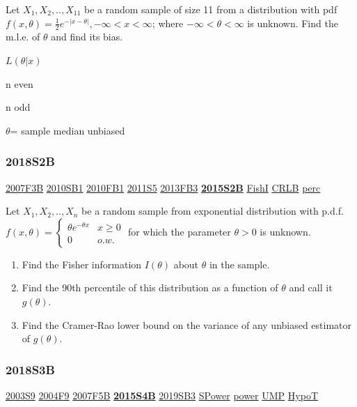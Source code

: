 \documentclass[10pt,twocolumn,portrait]{article}
\begin{document}
Let \(X_1,X_2,..,X_{11}\) be a random sample of size 11 from a
distribution with pdf
\(f(x,\theta) =\frac12e^{-|x-\theta|}, -\infty<x<\infty\); where
\(-\infty<\theta<\infty\) is unknown. Find the m.l.e. of \(\theta\) and
find its bias.

\(L(\theta|x)\)

n even

n odd

\(\theta\)= sample median unbiased

\hypertarget{s2b-2}{%
\subsubsection{2018S2B}\label{s2b-2}}

\protect\hyperlink{f3b}{2007F3B} \protect\hyperlink{sb1-1}{2010SB1}
\protect\hyperlink{fb1-1}{2010FB1} \protect\hyperlink{s5-2}{2011S5}
\protect\hyperlink{fb3-2}{2013FB3}
\textbf{\protect\hyperlink{s2b-1}{2015S2B}}
\protect\hyperlink{section-5}{FishI} \protect\hyperlink{section-5}{CRLB}
\protect\hyperlink{perc}{perc}

Let \(X_1,X_2,..,X_n\) be a random sample from exponential distribution
with p.d.f.
\(f(x,\theta)=\begin{cases}\theta e^{-\theta x}& x\ge0\\0& o.w.\end{cases}\)
for which the parameter \(\theta>0\) is unknown.

\begin{enumerate}
\def\labelenumi{(\alph{enumi})}
\item
  Find the Fisher information \(I(\theta)\) about \(\theta\) in the
  sample.
\item
  Find the 90th percentile of this distribution as a function of
  \(\theta\) and call it \(g(\theta)\).
\item
  Find the Cramer-Rao lower bound on the variance of any unbiased
  estimator of \(g(\theta)\).
\end{enumerate}

\hypertarget{s3b-2}{%
\subsubsection{2018S3B}\label{s3b-2}}

\protect\hyperlink{s9}{2003S9} \protect\hyperlink{f9-2}{2004F9}
\protect\hyperlink{f5b}{2007F5B}
\textbf{\protect\hyperlink{s4b-1}{2015S4B}}
\protect\hyperlink{sb3-3}{2019SB3} \protect\hyperlink{SPower}{SPower}
\protect\hyperlink{power}{power} \protect\hyperlink{section-7}{UMP}
\protect\hyperlink{HypoT}{HypoT}
\end{document}
